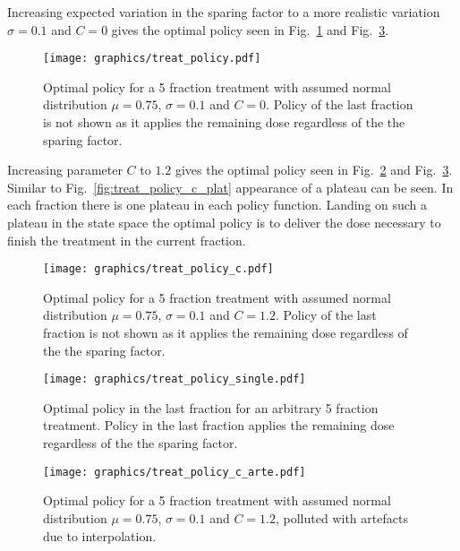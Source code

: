 \documentclass[\relativeRoot/ada.tex]{subfiles}
\begin{document}
Increasing expected variation in the sparing factor to a more realistic variation $\sigma=0.1$ and $C=0$ gives the optimal policy seen in Fig.~\ref{fig:treat_policy} and Fig.~\ref{fig:treat_policy_single}.

\begin{figure}[!htb]
    \centering
    \texttt{[image: graphics/treat\_policy.pdf]}
    \caption{Optimal policy for a 5 fraction treatment with assumed normal distribution $\mu=0.75$, $\sigma=0.1$ and $C=0$. Policy of the last fraction is not shown as it applies the remaining dose regardless of the the sparing factor.}
    \label{fig:treat_policy}
\end{figure}

Increasing parameter $C$ to $1.2$ gives the optimal policy seen in Fig.~\ref{fig:treat_policy_c} and Fig.~\ref{fig:treat_policy_single}. Similar to Fig.~\ref{fig:treat_policy_c_plat} appearance of a plateau can be seen. In each fraction there is one plateau in each policy function. Landing on such a plateau in the state space the optimal policy is to deliver the dose necessary to finish the treatment in the current fraction.

\begin{figure}[!htb]
    \centering
    \texttt{[image: graphics/treat\_policy\_c.pdf]}
    \caption{Optimal policy for a 5 fraction treatment with assumed normal distribution $\mu=0.75$, $\sigma=0.1$ and $C=1.2$. Policy of the last fraction is not shown as it applies the remaining dose regardless of the the sparing factor.}
    \label{fig:treat_policy_c}
\end{figure}

\begin{figure}[!htb]
    \centering
    \texttt{[image: graphics/treat\_policy\_single.pdf]}
    \caption{Optimal policy in the last fraction for an arbitrary 5 fraction treatment. Policy in the last fraction applies the remaining dose regardless of the the sparing factor.}
    \label{fig:treat_policy_single}
\end{figure}

\begin{figure}[!htb]
    \centering
    \texttt{[image: graphics/treat\_policy\_c\_arte.pdf]}
    \caption{Optimal policy for a 5 fraction treatment with assumed normal distribution $\mu=0.75$, $\sigma=0.1$ and $C=1.2$, polluted with artefacts due to interpolation.}
    \label{fig:treat_policy_c_arte}
\end{figure}
\end{document}
